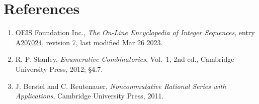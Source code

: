 \documentclass[11pt]{article}
\theoremstyle{definition}
\begin{document}
\section{References}

\begin{enumerate}

\item OEIS Foundation Inc., \emph{The On-Line Encyclopedia of Integer Sequences}, entry \href{https://oeis.org/A207024}{A207024}, revision 7, last modified Mar 26 2023.

\item R. P. Stanley, \emph{Enumerative Combinatorics}, Vol.~1, 2nd ed., Cambridge University Press, 2012; \S4.7.

\item J. Berstel and C. Reutenauer, \emph{Noncommutative Rational Series with Applications}, Cambridge University Press, 2011.

\end{enumerate}
\end{document}
